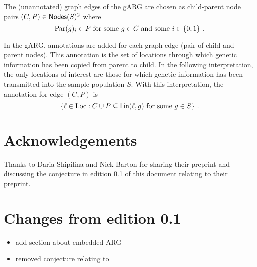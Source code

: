 \documentclass{article}
\begin{document}
The (unannotated) graph edges of the gARG are chosen as child-parent
node pairs \((C, P) \in \mathsf{Nodes}(S)^2\) where \[
  \mathrm{Par}(g)_i \in P \text{ for some $g \in C$ and some $i \in \{0, 1\}$ .}
\]

In the gARG, annotations are added for each graph edge (pair of child
and parent nodes). This annotation is the set of locations through which
genetic information has been copied from parent to child. In the
following interpretation, the only locations of interest are those for
which genetic information has been transmitted into the sample
population \(S\). With this interpretation, the annotation for edge
\((C,P)\) is \[
  \{ \ell \in \mathrm{Loc} :
     C \cup P \subseteq \mathsf{Lin}(\ell, g) \text{ for some $g \in S$}
  \}
\text{ .}
\]

\section{Acknowledgements}

Thanks to Daria Shipilina and Nick Barton for sharing their preprint
\cite{shipilina_origin_2022} and discussing the conjecture in edition
0.1 of this document relating to their preprint.

\section{Changes from edition 0.1}

\begin{itemize}
\item
  add section about embedded ARG
\item
  removed conjecture relating to \cite{shipilina_origin_2022}
\end{itemize}


\printbibliography
\end{document}
